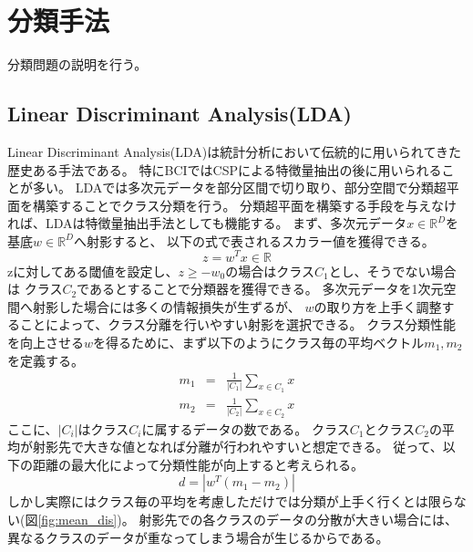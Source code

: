 \section{分類手法}
分類問題の説明を行う。

\subsection{Linear Discriminant Analysis(LDA)}
\label{subsec:LDA}
Linear Discriminant Analysis(LDA)は統計分析において伝統的に用いられてきた歴史ある手法である。
特にBCIではCSPによる特徴量抽出の後に用いられることが多い。
LDAでは多次元データを部分区間で切り取り、部分空間で分類超平面を構築することでクラス分類を行う。
分類超平面を構築する手段を与えなければ、LDAは特徴量抽出手法としても機能する。
まず、多次元データ\(x\in \mathbb R^D\)を基底\(w \in \mathbb R^D\)へ射影すると、
以下の式で表されるスカラー値を獲得できる。
\begin{equation}
    z = w^Tx \in \mathbb R
\end{equation}
zに対してある閾値を設定し、\(z \geq -w_0\)の場合はクラス\(C_1\)とし、そうでない場合は
クラス\(C_2\)であるとすることで分類器を獲得できる。
多次元データを1次元空間へ射影した場合には多くの情報損失が生ずるが、
\(w\)の取り方を上手く調整することによって、クラス分離を行いやすい射影を選択できる。
クラス分類性能を向上させる\(w\)を得るために、まず以下のようにクラス毎の平均ベクトル\(m_1,m_2\)を定義する。
\begin{eqnarray}
    m_{1} & = & \frac{1}{|C_1|}\sum_{x\in C_1}x  \\
    m_{2} & = & \frac{1}{|C_2|}\sum_{x\in C_2}x
\end{eqnarray}
ここに、\(|C_i|\)はクラス\(C_i\)に属するデータの数である。
クラス\(C_1\)とクラス\(C_2\)の平均が射影先で大きな値となれば分離が行われやすいと想定できる。
従って、以下の距離の最大化によって分類性能が向上すると考えられる。
\begin{equation}
    d=|w^T(m_1-m_2)|
    \label{eq:dis}
\end{equation}
しかし実際にはクラス毎の平均を考慮しただけでは分類が上手く行くとは限らない(図\ref{fig:mean_dis})。
射影先での各クラスのデータの分散が大きい場合には、異なるクラスのデータが重なってしまう場合が生じるからである。
